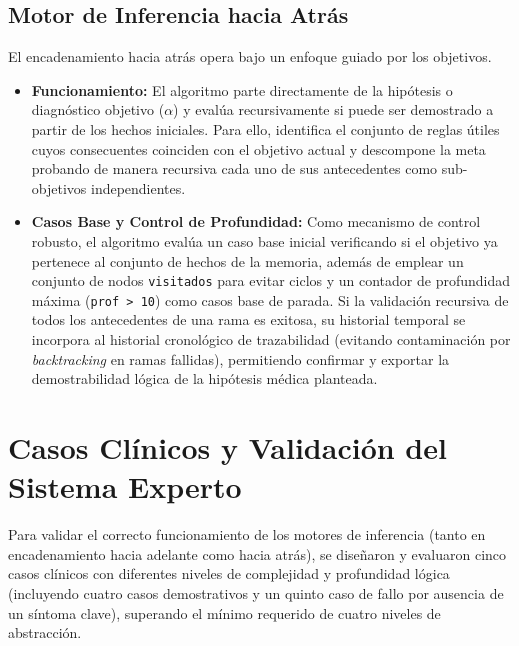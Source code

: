 \documentclass[11pt,a4paper]{article}
\begin{document}
\subsection{Motor de Inferencia hacia Atrás}
El encadenamiento hacia atrás opera bajo un enfoque guiado por los objetivos.
\begin{itemize}
    \item \textbf{Funcionamiento:} El algoritmo parte directamente de la hipótesis o diagnóstico objetivo ($\alpha$) y evalúa recursivamente si puede ser demostrado a partir de los hechos iniciales. Para ello, identifica el conjunto de reglas útiles cuyos consecuentes coinciden con el objetivo actual y descompone la meta probando de manera recursiva cada uno de sus antecedentes como sub-objetivos independientes.
    \item \textbf{Casos Base y Control de Profundidad:} Como mecanismo de control robusto, el algoritmo evalúa un caso base inicial verificando si el objetivo ya pertenece al conjunto de hechos de la memoria, además de emplear un conjunto de nodos \texttt{visitados} para evitar ciclos y un contador de profundidad máxima (\texttt{prof > 10}) como casos base de parada. Si la validación recursiva de todos los antecedentes de una rama es exitosa, su historial temporal se incorpora al historial cronológico de trazabilidad (evitando contaminación por \textit{backtracking} en ramas fallidas), permitiendo confirmar y exportar la demostrabilidad lógica de la hipótesis médica planteada.
\end{itemize}

\section{Casos Clínicos y Validación del Sistema Experto}

Para validar el correcto funcionamiento de los motores de inferencia (tanto en encadenamiento hacia adelante como hacia atrás), se diseñaron y evaluaron cinco casos clínicos con diferentes niveles de complejidad y profundidad lógica (incluyendo cuatro casos demostrativos y un quinto caso de fallo por ausencia de un síntoma clave), superando el mínimo requerido de cuatro niveles de abstracción.
\end{document}
